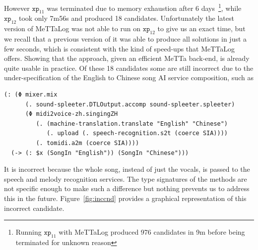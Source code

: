 \documentclass[]{report}
\begin{document}
\pagebreak
However $\texttt{xp}_{11}$ was terminated due to memory exhaustion
after 6 days~\footnote{Running $\texttt{xp}_{11}$ with MeTTaLog
produced 976 candidates in 9m before being terminated for unknown
reason}, while $\texttt{xp}_{12}$ took only 7m56s and produced 18
candidates.  Unfortunately the latest version of MeTTaLog was not able
to run on $\texttt{xp}_{12}$ to give us an exact time, but we recall
that a previous version of it was able to produce all solutions in
just a few seconds, which is consistent with the kind of speed-ups
that MeTTaLog offers.  Showing that the approach, given an efficient
MeTTa back-end, is already quite usable in practice.  Of these 18
candidates some are still incorrect due to the under-specification of
the English to Chinese song AI service composition, such as
\begin{small}
\begin{verbatim}
(: (Φ mixer.mix
      (. sound-spleeter.DTLOutput.accomp sound-spleeter.spleeter)
      (Φ midi2voice-zh.singingZH
         (. (machine-translation.translate "English" "Chinese")
            (. upload (. speech-recognition.s2t (coerce SIA))))
         (. tomidi.a2m (coerce SIA))))
  (-> (: $x (SongIn "English")) (SongIn "Chinese")))
\end{verbatim}
\end{small}
It is incorrect because the whole song, instead of just the vocals, is
passed to the speech and melody recognition services.  The type
signatures of the methods are not specific enough to make such a
difference but nothing prevents us to address this in the future.
Figure~\ref{fig:inccnd} provides a graphical representation of this
incorrect candidate.
\end{document}
